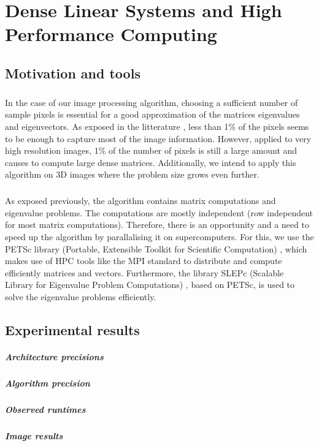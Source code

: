 \chapter{Dense Linear Systems and High Performance Computing}



\section{Motivation and tools}

\paragraph{}
In the case of our image processing algorithm, choosing a sufficient number of sample pixels is essential for a good approximation of the matrices eigenvalues and eigenvectors.
As exposed in the litterature \cite{glide_2014} \cite{fowlkes_spectral_2004}, less than 1\% of the pixels seems to be enough to capture most of the image information.
However, applied to very high resolution images, 1\% of the number of pixels is still a large amount and causes to compute large dense matrices.
Additionally, we intend to apply this algorithm on 3D images where the problem size grows even further.

\paragraph{}
As exposed previously, the algorithm contains matrix computations and eigenvalue problems.
The computations are mostly independent (row independent for most matrix computations).
Therefore, there is an opportunity and a need to speed up the algorithm by parallalising it on supercomputers.
For this, we use the PETSc library (Portable, Extensible Toolkit for Scientific Computation) \cite{petsc_web_page}, which makes use of HPC tools like the MPI standard to distribute and compute efficiently matrices and vectors.
Furthermore, the library SLEPc (Scalable Library for Eigenvalue Problem Computations) \cite{hernandez_2005_slepc}, based on PETSc, is used to solve the eigenvalue problems efficiently.

\section{Experimental results}

\paragraph{Architecture precisions}

\paragraph{Algorithm precision}

\paragraph{Observed runtimes}

\paragraph{Image results}

